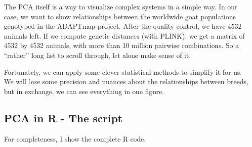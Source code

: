 \documentclass[]{book}
\begin{document}
The PCA itself is a way to visualize complex systems in a simple way. In
our case, we want to show relationships between the worldwide goat
populations genotyped in the ADAPTmap project. After the quality
control, we have 4532 animals left. If we compute genetic distances
(with PLINK), we get a matrix of 4532 by 4532 animals, with more than 10
million pairwise combinations. So a ``rather'' long list to scroll
through, let alone make sense of it.

Fortunately, we can apply some clever statistical methods to simplify it
for us. We will lose some precision and nuances about the relationships
between breeds, but in exchange, we can see everything in one figure.

\subsection{PCA in R - The script}\label{pca-in-r---the-script}

For completeness, I show the complete R code.
\end{document}
